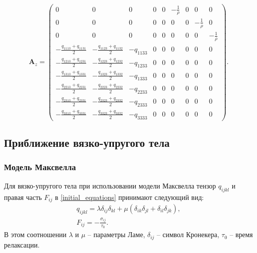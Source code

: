 \begin{displaymath}
\mathbf{A}_z =
\left( \begin{array}{cccccccccccc}
0 & 0 & 0 & 0 & 0 & -\frac 1 \rho & 0 & 0 & 0 \\ 
0 & 0 & 0 & 0 & 0 & 0 & 0 & -\frac 1 \rho & 0 \\ 
0 & 0 & 0 & 0 & 0 & 0 & 0 & 0 & -\frac 1 \rho \\ 
-\frac{q_{1113}+q_{1131}}{2} & -\frac{q_{1123}+q_{1132}}{2} & -q_{1133} & 0 & 0 & 0 & 0 & 0 & 0 \\ 
-\frac{q_{1213}+q_{1231}}{2} & -\frac{q_{1223}+q_{1232}}{2} & -q_{1233} & 0 & 0 & 0 & 0 & 0 & 0 \\ 
-\frac{q_{1313}+q_{1331}}{2} & -\frac{q_{1323}+q_{1332}}{2} & -q_{1333} & 0 & 0 & 0 & 0 & 0 & 0 \\ 
-\frac{q_{2213}+q_{2231}}{2} & -\frac{q_{2223}+q_{2232}}{2} & -q_{2233} & 0 & 0 & 0 & 0 & 0 & 0 \\ 
-\frac{q_{2313}+q_{2331}}{2} & -\frac{q_{2323}+q_{2332}}{2} & -q_{2333} & 0 & 0 & 0 & 0 & 0 & 0 \\ 
-\frac{q_{3313}+q_{3331}}{2} & -\frac{q_{3323}+q_{3332}}{2} & -q_{3333} & 0 & 0 & 0 & 0 & 0 & 0  
\end{array} \right).
\end{displaymath}


\clearpage
\newpage

\subsection{Приближение вязко-упругого тела}

\subsubsection{Модель Максвелла}
\label{viscosity_matrixes}

Для вязко-упругого тела при использовании модели Максвелла тензор $q_{ijkl}$ и правая часть $F_{ij}$ в \ref{initial_equations} принимают следующий вид:
\begin{eqnarray}
\label{tensor_qijkl_viscosity}
q_{ijkl}=\lambda\delta_{ij}\delta_{kl}+\mu(\delta_{ik}\delta_{jl}+\delta_{il}
\delta_{jk}),\nonumber\\
F_{ij}=-\frac{\sigma_{ij}}{\tau_0}.
\end{eqnarray}
В этом соотношении $\lambda$ и $\mu$ -- параметры Ламе, $\delta_{ij}$ -- символ Кронекера, $\tau_0$ -- время релаксации.



